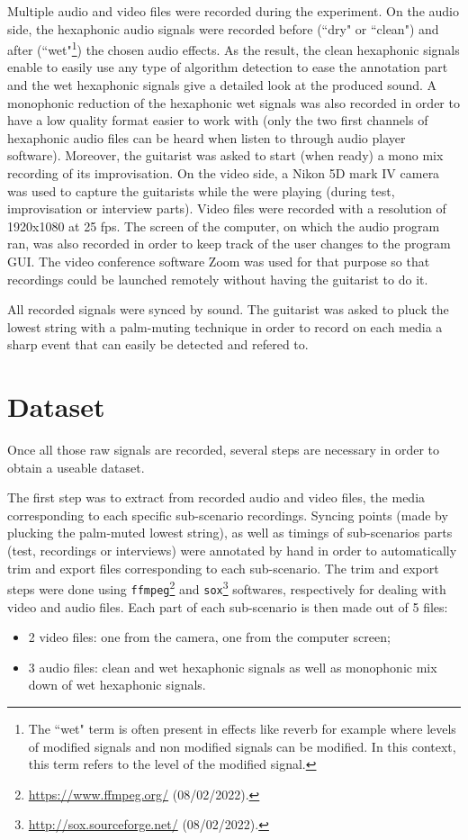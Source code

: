 \documentclass{article}
\begin{document}
Multiple audio and video files were recorded during the experiment. 
On the audio side, the hexaphonic audio signals were recorded before (``dry" or ``clean") and after \linebreak(``wet"\footnote{The ``wet" term is often present in effects like reverb for example where levels of modified signals and non modified signals can be modified. In this context, this term refers to the level of the modified signal.}) the chosen audio effects. As the result, the clean hexaphonic signals enable to easily use any type of algorithm detection to ease the annotation part and the wet hexaphonic signals give a detailed look at the produced sound. A monophonic reduction of the hexaphonic wet signals was also recorded in order to have a low quality format easier to work with (only the two first channels of hexaphonic audio files can be heard when listen to through audio player software).
Moreover, the guitarist was asked to start (when ready) a mono mix recording of its improvisation. 
On the video side, a Nikon 5D mark IV camera was used to capture the guitarists while the were playing (during test, improvisation or interview parts). Video files were recorded with a resolution of 1920x1080 at 25 fps. The screen of the computer, on which the audio program ran, was also recorded in order to keep track of the user changes to the program GUI. The video conference software Zoom was used for that purpose so that recordings could be launched remotely without having the guitarist to do it.

All recorded signals were synced by sound. The guitarist was asked to pluck the lowest string with a palm-muting technique in order to record on each media a sharp event that can easily be detected and refered to.

\section{Dataset}\label{sec:dataset}
Once all those raw signals are recorded, several steps are necessary in order to obtain a useable dataset. 

The first step was to extract from recorded audio and video files, the media corresponding to each specific sub-scenario recordings. Syncing points (made by plucking the palm-muted lowest string), as well as timings of sub-scenarios parts (test, recordings or interviews) were annotated by hand in order to automatically trim and export files corresponding to each sub-scenario. The trim and export steps were done using \texttt{ffmpeg}\footnote{\url{https://www.ffmpeg.org/} (08/02/2022).} and \texttt{sox}\footnote{\url{http://sox.sourceforge.net/} (08/02/2022).} softwares, respectively for dealing with video and audio files. Each part of each sub-scenario is then made out of 5 files: 
\begin{itemize}
\item 2 video files: one from the camera, one from the computer screen;
\item 3 audio files: clean and wet hexaphonic signals as well as monophonic mix down of wet hexaphonic signals.
\end{itemize}  
\end{document}
